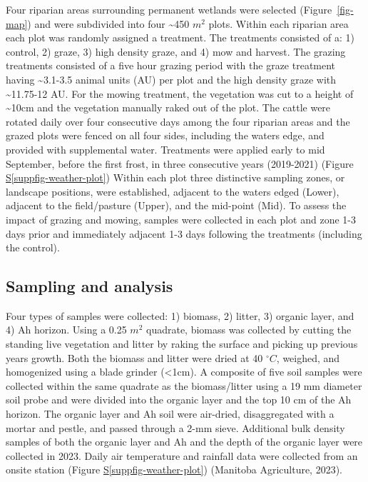 \documentclass[
]{agujournal2019}
\newcommand*\quartosuppfigref[1]{Figure \hyperref[#1]{S\ref{#1}}}
\begin{document}
Four riparian areas surrounding permanent wetlands were selected
(Figure~\ref{fig-map}) and were subdivided into four \textasciitilde450
\(m^2\) plots. Within each riparian area each plot was randomly assigned
a treatment. The treatments consisted of a: 1) control, 2) graze, 3)
high density graze, and 4) mow and harvest. The grazing treatments
consisted of a five hour grazing period with the graze treatment having
\textasciitilde3.1-3.5 animal units (AU) per plot and the high density
graze with \textasciitilde11.75-12 AU. For the mowing treatment, the
vegetation was cut to a height of \textasciitilde10cm and the vegetation
manually raked out of the plot. The cattle were rotated daily over four
consecutive days among the four riparian areas and the grazed plots were
fenced on all four sides, including the waters edge, and provided with
supplemental water. Treatments were applied early to mid September,
before the first frost, in three consecutive years (2019-2021)
(\quartosuppfigref{suppfig-weather-plot}) Within each plot three
distinctive sampling zones, or landscape positions, were established,
adjacent to the waters edged (Lower), adjacent to the field/pasture
(Upper), and the mid-point (Mid). To assess the impact of grazing and
mowing, samples were collected in each plot and zone 1-3 days prior and
immediately adjacent 1-3 days following the treatments (including the
control).

\subsection{Sampling and analysis}\label{sampling-and-analysis}

Four types of samples were collected: 1) biomass, 2) litter, 3) organic
layer, and 4) Ah horizon. Using a 0.25 \(m^2\) quadrate, biomass was
collected by cutting the standing live vegetation and litter by raking
the surface and picking up previous years growth. Both the biomass and
litter were dried at 40 \(^\circ C\), weighed, and homogenized using a
blade grinder (\textless1cm). A composite of five soil samples were
collected within the same quadrate as the biomass/litter using a 19 mm
diameter soil probe and were divided into the organic layer and the top
10 cm of the Ah horizon. The organic layer and Ah soil were air-dried,
disaggregated with a mortar and pestle, and passed through a 2-mm sieve.
Additional bulk density samples of both the organic layer and Ah and the
depth of the organic layer were collected in 2023. Daily air temperature
and rainfall data were collected from an onsite station
(\quartosuppfigref{suppfig-weather-plot}) (Manitoba Agriculture, 2023).
\end{document}
